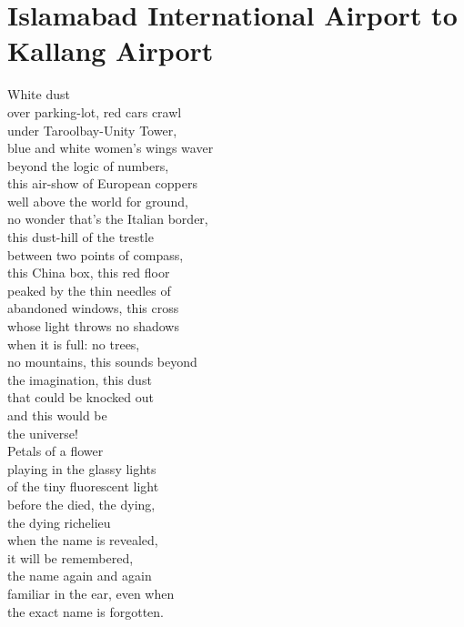 \documentclass[smalldemyvopaper,11pt,twoside,onecolumn,openright,extrafontsizes]{memoir}
\begin{document}
\chapter{Islamabad International Airport to Kallang Airport}
White dust
\\over parking-lot, red cars crawl
\\under Taroolbay-Unity Tower,
\\blue and white women's wings waver
\\beyond the logic of numbers,
\\this air-show of European coppers
\\well above the world for ground,
\\no wonder that's the Italian border,
\\this dust-hill of the trestle
\\between two points of compass,
\\this China box, this red floor
\\peaked by the thin needles of
\\abandoned windows, this cross
\\whose light throws no shadows
\\when it is full: no trees,
\\no mountains, this sounds beyond
\\the imagination, this dust
\\that could be knocked out
\\and this would be
\\the universe!
\\Petals of a flower
\\playing in the glassy lights
\\of the tiny fluorescent light
\\before the died, the dying,
\\the dying richelieu
\\when the name is revealed,
\\it will be remembered,
\\the name again and again
\\familiar in the ear, even when
\\the exact name is forgotten.
\end{document}
